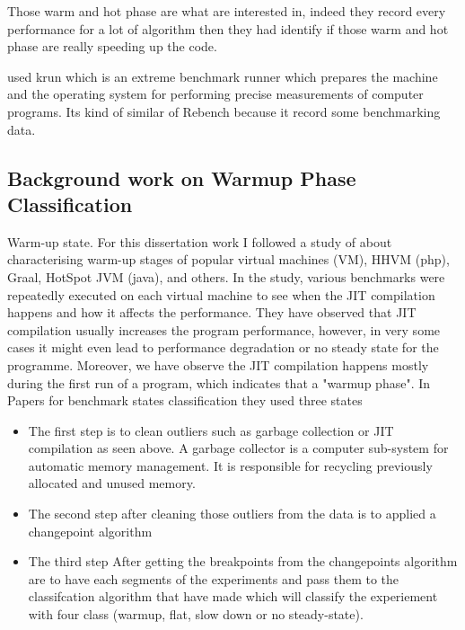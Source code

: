 \documentclass{article}
\begin{document}
Those warm and hot phase are what \cite{barrett2017virtual} are interested in, indeed they record every performance for a lot of algorithm then they had identify if those warm and hot phase are really speeding up the code.

\cite{barrett2017virtual} used krun which is an extreme benchmark runner which prepares the machine and the operating system for performing precise measurements of computer programs. Its kind of similar of Rebench because it record some benchmarking data.

\subsection{Background work on Warmup Phase Classification}

Warm-up state.
For this dissertation work I followed a study of \cite{barrett2017virtual} about characterising warm-up stages of popular virtual machines (VM), HHVM (php), Graal, HotSpot JVM (java), and others. 
In the study, various benchmarks were repeatedly executed on each virtual machine to see when the JIT compilation happens and how it affects the performance.
They have observed that JIT compilation usually increases the program performance, however, in very some cases it might even lead to performance degradation or no steady state for the programme. Moreover, we have observe the JIT compilation happens mostly during the first run of a program, which indicates that a "warmup phase".
In \cite{barrett2017virtual} Papers for benchmark states classification they used three states 

\begin{itemize}
    \item The first step is to clean outliers such as garbage collection or JIT compilation as seen above. A garbage collector       is a computer sub-system for automatic memory management.  It is responsible for recycling previously allocated and       unused memory.  
    \item The second step after cleaning those outliers from the data is to applied a changepoint algorithm \cite{killick2014changepoint}
    \item The third step After getting the breakpoints from the changepoints algorithm are to have each segments of the experiments and pass them to the classifcation algorithm that \cite{barrett2017virtual} have made which will classify the experiement with four class (warmup, flat, slow down or no steady-state).
\end{itemize}
\end{document}

